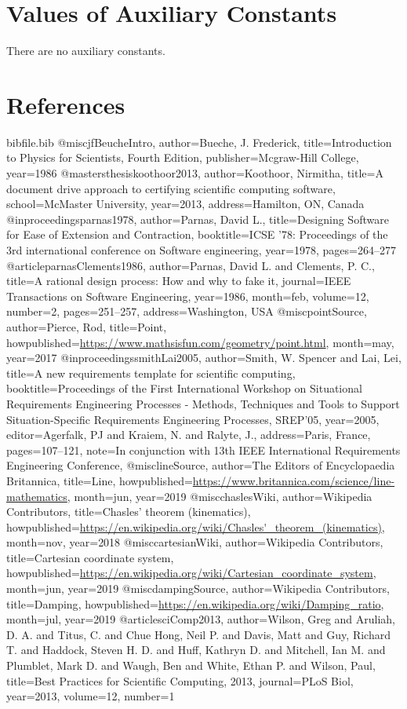 \documentclass[12pt]{article}
\begin{document}
\section{Values of Auxiliary Constants}
\label{Sec:AuxConstants}
There are no auxiliary constants.

\section{References}
\label{Sec:References}
\begin{filecontents*}{bibfile.bib}
@misc{jfBeucheIntro,
author={Bueche, J. Frederick},
title={Introduction to Physics for Scientists, Fourth Edition},
publisher={Mcgraw-Hill College},
year={1986}}
@mastersthesis{koothoor2013,
author={Koothoor, Nirmitha},
title={A document drive approach to certifying scientific computing software},
school={McMaster University},
year={2013},
address={Hamilton, ON, Canada}}
@inproceedings{parnas1978,
author={Parnas, David L.},
title={Designing Software for Ease of Extension and Contraction},
booktitle={ICSE '78: Proceedings of the 3rd international conference on Software engineering},
year={1978},
pages={264--277}}
@article{parnasClements1986,
author={Parnas, David L. and Clements, P. C.},
title={A rational design process: How and why to fake it},
journal={IEEE Transactions on Software Engineering},
year={1986},
month=feb,
volume={12},
number={2},
pages={251--257},
address={Washington, USA}}
@misc{pointSource,
author={Pierce, Rod},
title={Point},
howpublished={\url{https://www.mathsisfun.com/geometry/point.html}},
month=may,
year={2017}}
@inproceedings{smithLai2005,
author={Smith, W. Spencer and Lai, Lei},
title={A new requirements template for scientific computing},
booktitle={Proceedings of the First International Workshop on Situational Requirements Engineering Processes - Methods, Techniques and Tools to Support Situation-Specific Requirements Engineering Processes, SREP'05},
year={2005},
editor={Agerfalk, PJ and Kraiem, N. and Ralyte, J.},
address={Paris, France},
pages={107--121},
note={In conjunction with 13th IEEE International Requirements Engineering Conference,}}
@misc{lineSource,
author={The Editors of Encyclopaedia Britannica},
title={Line},
howpublished={\url{https://www.britannica.com/science/line-mathematics}},
month=jun,
year={2019}}
@misc{chaslesWiki,
author={Wikipedia Contributors},
title={Chasles' theorem (kinematics)},
howpublished={\url{https://en.wikipedia.org/wiki/Chasles'\_theorem\_(kinematics)}},
month=nov,
year={2018}}
@misc{cartesianWiki,
author={Wikipedia Contributors},
title={Cartesian coordinate system},
howpublished={\url{https://en.wikipedia.org/wiki/Cartesian\_coordinate\_system}},
month=jun,
year={2019}}
@misc{dampingSource,
author={Wikipedia Contributors},
title={Damping},
howpublished={\url{https://en.wikipedia.org/wiki/Damping\_ratio}},
month=jul,
year={2019}}
@article{sciComp2013,
author={Wilson, Greg and Aruliah, D. A. and Titus, C. and Chue Hong, Neil P. and Davis, Matt and Guy, Richard T. and Haddock, Steven H. D. and Huff, Kathryn D. and Mitchell, Ian M. and Plumblet, Mark D. and Waugh, Ben and White, Ethan P. and Wilson, Paul},
title={Best Practices for Scientific Computing, 2013},
journal={PLoS Biol},
year={2013},
volume={12},
number={1}}
\end{filecontents*}
\nocite{*}
\printbibliography[heading=none]
\end{document}

